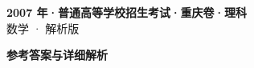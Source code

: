 \documentclass[zihao=-4, a4paper]{ctexart}
\begin{document}
\begin{center}
  {\Large\bfseries 2007 年·普通高等学校招生考试·重庆卷·理科}\\[4pt]
  {\large 数学 · 解析版}
\end{center}
\medskip
{}

\clearpage
{}
\begin{center}{\Large\bfseries 参考答案与详细解析}\end{center}
\medskip

\end{document}
